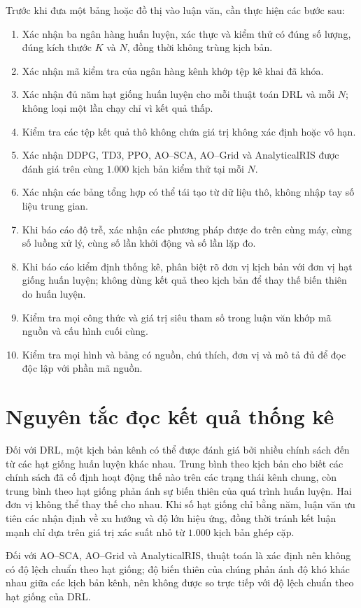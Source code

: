 Trước khi đưa một bảng hoặc đồ thị vào luận văn, cần thực hiện các bước sau:

\begin{enumerate}[leftmargin=*,itemsep=2pt]
\item Xác nhận ba ngân hàng huấn luyện, xác thực và kiểm thử có đúng số lượng, đúng kích
      thước $K$ và $N$, đồng thời không trùng kịch bản.
\item Xác nhận mã kiểm tra của ngân hàng kênh khớp tệp kê khai đã khóa.
\item Xác nhận đủ năm hạt giống huấn luyện cho mỗi thuật toán DRL và mỗi $N$; không loại
      một lần chạy chỉ vì kết quả thấp.
\item Kiểm tra các tệp kết quả thô không chứa giá trị không xác định hoặc vô hạn.
\item Xác nhận DDPG, TD3, PPO, AO--SCA, AO--Grid và AnalyticalRIS được đánh giá trên cùng
      $1.000$ kịch bản kiểm thử tại mỗi $N$.
\item Xác nhận các bảng tổng hợp có thể tái tạo từ dữ liệu thô, không nhập tay số liệu
      trung gian.
\item Khi báo cáo độ trễ, xác nhận các phương pháp được đo trên cùng máy, cùng số luồng xử
      lý, cùng số lần khởi động và số lần lặp đo.
\item Khi báo cáo kiểm định thống kê, phân biệt rõ đơn vị kịch bản với đơn vị hạt giống
      huấn luyện; không dùng kết quả theo kịch bản để thay thế biến thiên do huấn luyện.
\item Kiểm tra mọi công thức và giá trị siêu tham số trong luận văn khớp mã nguồn và cấu
      hình cuối cùng.
\item Kiểm tra mọi hình và bảng có nguồn, chú thích, đơn vị và mô tả đủ để đọc độc lập với
      phần mã nguồn.
\end{enumerate}

\section{Nguyên tắc đọc kết quả thống kê}
\label{sec:nguyen-tac-thong-ke}

Đối với DRL, một kịch bản kênh có thể được đánh giá bởi nhiều chính sách đến từ các hạt
giống huấn luyện khác nhau. Trung bình theo kịch bản cho biết các chính sách đã cố định
hoạt động thế nào trên các trạng thái kênh chung, còn trung bình theo hạt giống phản ánh
sự biến thiên của quá trình huấn luyện. Hai đơn vị không thể thay thế cho nhau. Khi số hạt
giống chỉ bằng năm, luận văn ưu tiên các nhận định về xu hướng và độ lớn hiệu ứng, đồng
thời tránh kết luận mạnh chỉ dựa trên giá trị xác suất nhỏ từ $1.000$ kịch bản ghép cặp.

Đối với AO--SCA, AO--Grid và AnalyticalRIS, thuật toán là xác định nên không có độ lệch
chuẩn theo hạt giống; độ biến thiên của chúng phản ánh độ khó khác nhau giữa các kịch bản
kênh, nên không được so trực tiếp với độ lệch chuẩn theo hạt giống của DRL.
